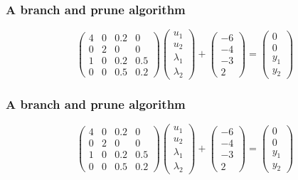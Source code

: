 \frame
{
\frametitle{A branch and prune algorithm}
\[\left(\begin{array}{cccc}
4&0&0.2&0\\
0&2&0&0\\
1&0&0.2&0.5\\
0&0&0.5&0.2
 \end{array}\right) \left(\begin{array}{c}
 u_1\\
 u_2\\
 \lambda_1\\
 \lambda_2
 \end{array}\right) + \left(\begin{array}{c}
 -6\\
 -4\\
 -3\\
 2
 \end{array}\right) =  \left(\begin{array}{c}
 0\\
 0\\
 y_1\\
 y_2
 \end{array}\right) 
 \]
\begin{figure}[h]
\centerline{
 \scalebox{0.5}{
    
 }
}
\end{figure}

}
\frame
{
\frametitle{A branch and prune algorithm}
\[\left(\begin{array}{cccc}
4&0&0.2&0\\
0&2&0&0\\
1&0&0.2&0.5\\
0&0&0.5&0.2
 \end{array}\right) \left(\begin{array}{c}
 u_1\\
 u_2\\
 \lambda_1\\
 \lambda_2
 \end{array}\right) + \left(\begin{array}{c}
 -6\\
 -4\\
 -3\\
 2
 \end{array}\right) =  \left(\begin{array}{c}
 0\\
 0\\
 y_1\\
 y_2
 \end{array}\right) 
 \]
\begin{figure}[h]
\centerline{
 \scalebox{0.5}{
    
 }
}
\end{figure}

}